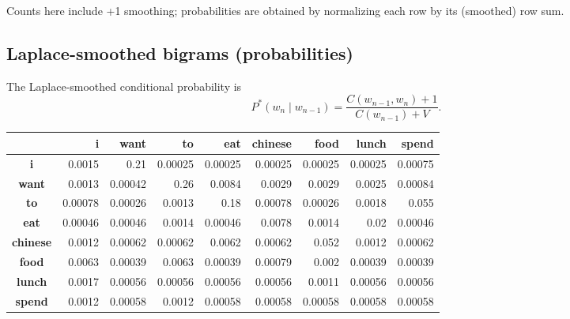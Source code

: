 \documentclass[11pt,a4paper]{article}
\theoremstyle{definition}
\theoremstyle{plain}
\theoremstyle{remark}
\begin{document}
\vspace{0.5em}
Counts here include +1 smoothing; probabilities are obtained by normalizing each row by its (smoothed) row sum.

\subsection{Laplace-smoothed bigrams (probabilities)}
The Laplace-smoothed conditional probability is
\[
P^{*}(w_n\mid w_{n-1})=\frac{C(w_{n-1},w_n)+1}{C(w_{n-1})+V}.
\]
\begin{center}
\setlength{\tabcolsep}{6pt}
\renewcommand{\arraystretch}{1.2}
\scriptsize
\begin{tabular}{|c|r|r|r|r|r|r|r|r|}
\hline
 & \textbf{i} & \textbf{want} & \textbf{to} & \textbf{eat} & \textbf{chinese} & \textbf{food} & \textbf{lunch} & \textbf{spend} \\ \hline
\textbf{i}       & 0.0015 & 0.21   & 0.00025 & 0.00025 & 0.00025 & 0.00025 & 0.00025 & 0.00075 \\ \hline
\textbf{want}    & 0.0013 & 0.00042& 0.26    & 0.0084  & 0.0029  & 0.0029  & 0.0025  & 0.00084 \\ \hline
\textbf{to}      & 0.00078& 0.00026& 0.0013  & 0.18    & 0.00078 & 0.00026 & 0.0018  & 0.055   \\ \hline
\textbf{eat}     & 0.00046& 0.00046& 0.0014  & 0.00046 & 0.0078  & 0.0014  & 0.02    & 0.00046 \\ \hline
\textbf{chinese} & 0.0012 & 0.00062& 0.00062 & 0.0062  & 0.00062 & 0.052   & 0.0012  & 0.00062 \\ \hline
\textbf{food}    & 0.0063 & 0.00039& 0.0063  & 0.00039 & 0.00079 & 0.002   & 0.00039 & 0.00039 \\ \hline
\textbf{lunch}   & 0.0017 & 0.00056& 0.00056 & 0.00056 & 0.00056 & 0.0011  & 0.00056 & 0.00056 \\ \hline
\textbf{spend}   & 0.0012 & 0.00058& 0.0012  & 0.00058 & 0.00058 & 0.00058 & 0.00058 & 0.00058 \\ \hline
\end{tabular}
\end{center}
\end{document}
